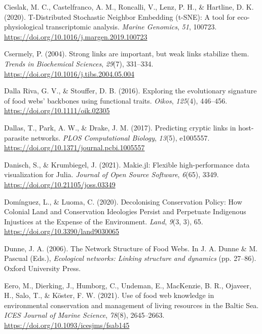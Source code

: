 \documentclass[10pt,oneside]{article}
\newlength{\cslhangindent}
\newenvironment{CSLReferences}[2] %
 {%
  \setlength{\parindent}{0pt}
  \ifodd #1 \everypar{\setlength{\hangindent}{\cslhangindent}}\ignorespaces\fi
  \ifnum #2 > 0
  \setlength{\parskip}{#2\baselineskip}
  \fi
 }%
 {}
\begin{document}
\begin{CSLReferences}{1}{0}
\leavevmode{}%
Cieslak, M. C., Castelfranco, A. M., Roncalli, V., Lenz, P. H., \&
Hartline, D. K. (2020). T-Distributed Stochastic Neighbor Embedding
(t-SNE): A tool for eco-physiological transcriptomic analysis.
\emph{Marine Genomics}, \emph{51}, 100723.
\url{https://doi.org/10.1016/j.margen.2019.100723}

\leavevmode{}%
Csermely, P. (2004). Strong links are important, but weak links
stabilize them. \emph{Trends in Biochemical Sciences}, \emph{29}(7),
331--334. \url{https://doi.org/10.1016/j.tibs.2004.05.004}

\leavevmode{}%
Dalla Riva, G. V., \& Stouffer, D. B. (2016). Exploring the evolutionary
signature of food webs' backbones using functional traits. \emph{Oikos},
\emph{125}(4), 446--456. \url{https://doi.org/10.1111/oik.02305}

\leavevmode{}%
Dallas, T., Park, A. W., \& Drake, J. M. (2017). Predicting cryptic
links in host-parasite networks. \emph{PLOS Computational Biology},
\emph{13}(5), e1005557.
\url{https://doi.org/10.1371/journal.pcbi.1005557}

\leavevmode{}%
Danisch, S., \& Krumbiegel, J. (2021). Makie.jl: Flexible
high-performance data visualization for Julia. \emph{Journal of Open
Source Software}, \emph{6}(65), 3349.
\url{https://doi.org/10.21105/joss.03349}

\leavevmode{}%
Domínguez, L., \& Luoma, C. (2020). Decolonising Conservation Policy:
How Colonial Land and Conservation Ideologies Persist and Perpetuate
Indigenous Injustices at the Expense of the Environment. \emph{Land},
\emph{9}(3, 3), 65. \url{https://doi.org/10.3390/land9030065}

\leavevmode{}%
Dunne, J. A. (2006). The Network Structure of Food Webs. In J. A. Dunne
\& M. Pascual (Eds.), \emph{Ecological networks: Linking structure and
dynamics} (pp. 27--86). Oxford University Press.

\leavevmode{}%
Eero, M., Dierking, J., Humborg, C., Undeman, E., MacKenzie, B. R.,
Ojaveer, H., Salo, T., \& Köster, F. W. (2021). Use of food web
knowledge in environmental conservation and management of living
resources in the Baltic Sea. \emph{ICES Journal of Marine Science},
\emph{78}(8), 2645--2663. \url{https://doi.org/10.1093/icesjms/fsab145}


\end{CSLReferences}
\end{document}
